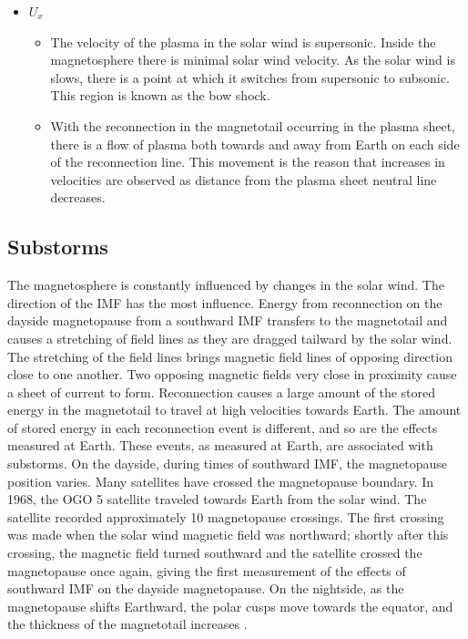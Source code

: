 \begin{itemize}
	\item $U_x$
	\begin{itemize}
		\item The velocity of the plasma in the solar wind is supersonic. Inside the
		magnetosphere there is minimal solar wind velocity. As the
		solar wind is slows, there is a point at which it switches from supersonic to subsonic. This region is known
		as the bow shock.
		\item With the reconnection in the magnetotail occurring in the plasma sheet,
		there is a flow of plasma both towards and away from Earth on each side of
		the reconnection line. This movement is the reason that increases in
		velocities are observed as distance from the plasma sheet neutral line
		decreases.
	\end{itemize}
\end{itemize}

\subsection{Substorms}
The magnetosphere is constantly influenced by changes in the solar wind. The
direction of the IMF has the most influence. Energy from reconnection on the dayside magnetopause from a
southward IMF transfers to the magnetotail and causes a stretching of field
lines as they are dragged tailward by the solar wind. The stretching of the
field lines brings magnetic field lines of opposing direction close to one
another. Two opposing magnetic fields very close in proximity cause a sheet of
current to form. Reconnection causes a large amount of the stored
energy in the magnetotail to travel at high velocities towards Earth. The amount
of stored energy in each reconnection event is different, and so are the effects
measured at Earth. These events, as measured at Earth, are associated with substorms. On
the dayside, during times of southward IMF, the magnetopause position varies.
Many satellites have crossed the magnetopause boundary. In 1968, the OGO 5
satellite traveled towards Earth from the solar wind. The satellite recorded
approximately 10 magnetopause crossings. The first crossing was made when the
solar wind magnetic field was northward; shortly after this crossing, the
magnetic field turned southward and the satellite crossed the magnetopause once again, giving
the first measurement of the effects of southward IMF on the dayside
magnetopause. On the nightside, as the magnetopause shifts Earthward, the polar
cusps move towards the equator,	 and the thickness of the magnetotail increases
\citep{Kennel}.

